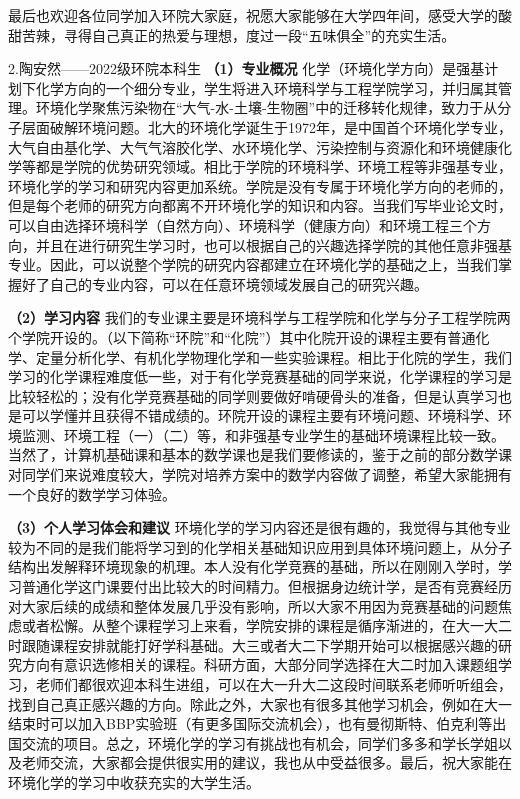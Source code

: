 \documentclass[11pt,oneside]{book}
\begin{document}
最后也欢迎各位同学加入环院大家庭，祝愿大家能够在大学四年间，感受大学的酸甜苦辣，寻得自己真正的热爱与理想，度过一段“五味俱全”的充实生活。

2.陶安然——2022级环院本科生
\textbf{（1）专业概况}
化学（环境化学方向）是强基计划下化学方向的一个细分专业，学生将进入环境科学与工程学院学习，并归属其管理。环境化学聚焦污染物在“大气-水-土壤-生物圈”中的迁移转化规律，致力于从分子层面破解环境问题。北大的环境化学诞生于1972年，是中国首个环境化学专业，大气自由基化学、大气气溶胶化学、水环境化学、污染控制与资源化和环境健康化学等都是学院的优势研究领域。相比于学院的环境科学、环境工程等非强基专业，环境化学的学习和研究内容更加系统。学院是没有专属于环境化学方向的老师的，但是每个老师的研究方向都离不开环境化学的知识和内容。当我们写毕业论文时，可以自由选择环境科学（自然方向）、环境科学（健康方向）和环境工程三个方向，并且在进行研究生学习时，也可以根据自己的兴趣选择学院的其他任意非强基专业。因此，可以说整个学院的研究内容都建立在环境化学的基础之上，当我们掌握好了自己的专业内容，可以在任意环境领域发展自己的研究兴趣。

\textbf{（2）学习内容}
我们的专业课主要是环境科学与工程学院和化学与分子工程学院两个学院开设的。（以下简称“环院”和“化院”）其中化院开设的课程主要有普通化学、定量分析化学、有机化学物理化学和一些实验课程。相比于化院的学生，我们学习的化学课程难度低一些，对于有化学竞赛基础的同学来说，化学课程的学习是比较轻松的；没有化学竞赛基础的同学则要做好啃硬骨头的准备，但是认真学习也是可以学懂并且获得不错成绩的。环院开设的课程主要有环境问题、环境科学、环境监测、环境工程（一）（二）等，和非强基专业学生的基础环境课程比较一致。当然了，计算机基础课和基本的数学课也是我们要修读的，鉴于之前的部分数学课对同学们来说难度较大，学院对培养方案中的数学内容做了调整，希望大家能拥有一个良好的数学学习体验。

\textbf{（3）个人学习体会和建议}
环境化学的学习内容还是很有趣的，我觉得与其他专业较为不同的是我们能将学习到的化学相关基础知识应用到具体环境问题上，从分子结构出发解释环境现象的机理。本人没有化学竞赛的基础，所以在刚刚入学时，学习普通化学这门课要付出比较大的时间精力。但根据身边统计学，是否有竞赛经历对大家后续的成绩和整体发展几乎没有影响，所以大家不用因为竞赛基础的问题焦虑或者松懈。从整个课程学习上来看，学院安排的课程是循序渐进的，在大一大二时跟随课程安排就能打好学科基础。大三或者大二下学期开始可以根据感兴趣的研究方向有意识选修相关的课程。科研方面，大部分同学选择在大二时加入课题组学习，老师们都很欢迎本科生进组，可以在大一升大二这段时间联系老师听听组会，找到自己真正感兴趣的方向。除此之外，大家也有很多其他学习机会，例如在大一结束时可以加入BBP实验班（有更多国际交流机会），也有曼彻斯特、伯克利等出国交流的项目。总之，环境化学的学习有挑战也有机会，同学们多多和学长学姐以及老师交流，大家都会提供很实用的建议，我也从中受益很多。最后，祝大家能在环境化学的学习中收获充实的大学生活。
\end{document}
